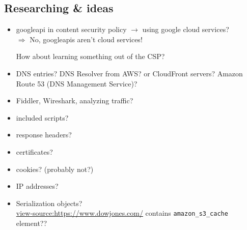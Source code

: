 \documentclass[12pt]{article}
\begin{document}
\subsection*{Researching \& ideas}
\begin{itemize}
    \item googleapi in content security policy $\rightarrow$ using google cloud services? \\
    $\Rightarrow$ No, googleapis aren't cloud services!
    
    How about learning something out of the CSP?
    
    \item DNS entries? DNS Resolver from AWS? or CloudFront servers? Amazon Route 53 (DNS Management Service)?
    
    \item Fiddler, Wireshark, analyzing traffic?
    
    \item included scripts?
    
    \item response headers?
    
    \item certificates?
    
    \item cookies? (probably not?)
    
    \item IP addresses?
    
    \item Serialization objects? \\
    \url{view-source:https://www.dowjones.com/} contains \verb|amazon_s3_cache| element??
\end{itemize}


\newpage
\end{document}
